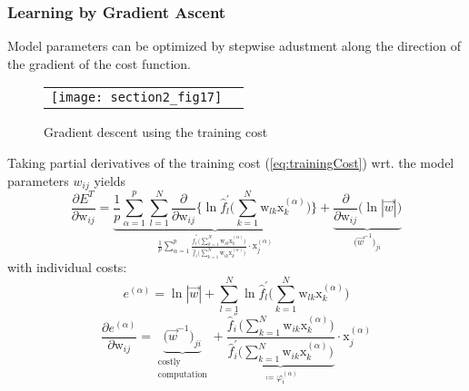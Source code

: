 
\subsubsection{Learning by Gradient Ascent}
Model parameters can be optimized by stepwise adustment along the direction of the gradient of the cost function. 

\begin{figure}[h]
  \centering
  \begin{tabular}[c c]{c c}
   \texttt{[image: section2\_fig17]}
  &\raisebox{2cm}{$\Delta \mathrm{w}_{ij} = \underbrace{ \eta }_{
    \substack{ \text{learning} \\ \text{step}} }
  \frac{\partial E^T}{\partial \mathrm{w}_{ij}}$}
  \end{tabular}  
  \caption{Gradient descent using the training cost}
  \label{fig:gradientDescent}
\end{figure}
\noindent Taking partial derivatives of the training cost (\ref{eq:trainingCost}) wrt. the model parameters $w_{ij}$ yields
\begin{equation}
	\frac{\partial E^T}{\partial \mathrm{w}_{ij}}
	= \underbrace{ \frac{1}{p} \sum\limits_{\alpha = 1}^p 
		\sum\limits_{l = 1}^N \frac{\partial}{\partial \mathrm{w}_{ij}}
		\Bigg\{ \ln \widehat{f}_l^{'} \Bigg( \sum\limits_{k = 1}^N 
		\mathrm{w}_{lk} \mathrm{x}_k^{(\alpha)} \Bigg) \Bigg\} }_{
			\frac{1}{p} \sum\limits_{\alpha = 1}^p 
			\frac{ \widehat{f}_i^{''} \Big( \sum\limits_{k = 1}^N 
				\mathrm{w}_{ik} \mathrm{x}_k^{(\alpha)} \Big)
			}{\widehat{f}_i^{'} \Big( \sum\limits_{k = 1}^N 
			\mathrm{w}_{ik} \mathrm{x}_k^{(\alpha)} \Big)}
			\cdot \mathrm{x}_j^{(\alpha)} }
		+ \underbrace{ \frac{\partial}{\partial \mathrm{w}_{ij}}
			\big( \ln |\vec{w}| \big) }_{
				\big( \vec{w}^{-1} \big)_{ji} }
\end{equation}
with individual costs:
\begin{equation}
	e^{(\alpha)} = \ln |\vec{w}| + \sum\limits_{l = 1}^N \ln
		\widehat{f}_l^{'} \Bigg( \sum\limits_{k = 1}^N 
		\mathrm{w}_{lk} \mathrm{x}_k^{(\alpha)} \Bigg)
\end{equation}
\begin{equation}
	\frac{\partial e^{(\alpha)}}{\partial \mathrm{w}_{ij}}
	= \underbrace{ \big( \vec{w}^{-1} \big)_{ji} }_{
		\substack{ \text{costly} \\ \text{computation}} }
		+ \underbrace{  
			\frac{ \widehat{f}_i^{''} \bigg( \sum\limits_{k = 1}^N 
				\mathrm{w}_{ik} \mathrm{x}_k^{(\alpha)} \bigg)
			}{\widehat{f}_i^{'} \bigg( \sum\limits_{k = 1}^N 
			\mathrm{w}_{ik} \mathrm{x}_k^{(\alpha)} \bigg)}
			 }_{ \coloneqq \varphi_i^{(\alpha)} }
		\cdot \mathrm{x}_j^{(\alpha)}
\end{equation}
